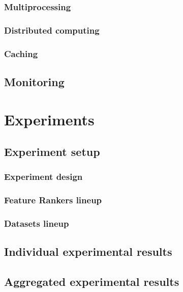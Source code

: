 \documentclass{article}
\begin{document}
\subsubsection{Multiprocessing}
\subsubsection{Distributed computing}
\subsubsection{Caching}

\subsection{Monitoring}



\section{Experiments}\label{section:experiments}
\subsection{Experiment setup}
\subsubsection{Experiment design}
\subsubsection{Feature Rankers lineup}
\subsubsection{Datasets lineup}

\subsection{Individual experimental results}
\subsection{Aggregated experimental results}
\end{document}
